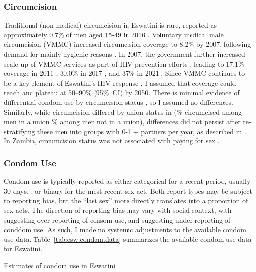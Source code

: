 \subsubsection{Circumcision}\label{model.par.tm.circ}
Traditional (non-medical) circumcision in Eswatini is rare,
reported as approximately 0.7\% of men aged 15-49 in 2016 \cite{SHIMS2}.
Voluntary medical male circumcision (VMMC) increased circumcision coverage to 8.2\% by 2007,
following demand for mainly hygienic reasons \cite{SDHS2006}.
In 2007, the government further increased scale-up of VMMC services
as part of HIV prevention efforts \cite{SDHS2006}, leading to
17.1\% coverage in 2011 \cite{SHIMS1},
30.0\% in 2017 \cite{SHIMS2}, and
37\% in 2021 \cite{EswCOP21}.
Since VMMC continues to be a key element of Eswatini's HIV response \cite{EswCOP21},
I assumed that coverage could reach and plateau at 50--90\% (95\%~CI) by 2050.
There is minimal evidence of differential condom use by circumcision status \cite{SHIMS1},
so I assumed no differences.
Similarly, while circumcision differed by union status in \cite{SHIMS2}
(\% circumcised among men in a union \% among men not in a union),
differences did not persist after re-stratifying these men
into groups with 0-1 + partners per year, as described in .
In Zambia, circumcision status was not associated with paying for sex \cite{Carrasco2020}.
\subsubsection{Condom Use}\label{model.par.tm.condom}
Condom use is typically reported as either
categorical for a recent period, usually 30 days,
\eg {}; or
binary for the most recent sex act.
Both report types may be subject to reporting bias,
but the ``last sex'' more directly translates into a proportion of sex acts.
The direction of reporting bias may vary with social context, with
\cite{Cordero-Coma2012} suggesting over-reporting of consom use, and
\cite{Behanzin2013} suggesting under-reporting of conddom use.
As such, I made no systemic adjustments to the available condom use data.
Table~\ref{tab:esw.condom.data} summarizes the available condom use data for Eswatini.
\begin{table}
  \centering
  \caption{Estimates of condom use in Eswatini}
  \label{tab:esw.condom.data}
  
\end{table}

